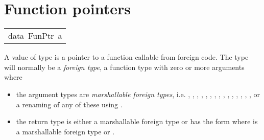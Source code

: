 \section{Function pointers
}
\begin{haddockdesc}
\item[\begin{tabular}{@{}l}
data\ FunPtr\ a
\end{tabular}]\haddockbegindoc
A value of type  is a pointer to a function callable
 from foreign code.  The type  will normally be a \emph{foreign type},
 a function type with zero or more arguments where
\par
\begin{itemize}
\item
 the argument types are \emph{marshallable foreign types},
   i.e. , , , ,
   , , , ,
   , , ,
   , , , ,
    or a renaming of any of these
   using .
\par

\item
 the return type is either a marshallable foreign type or has the form
    where  is a marshallable foreign type or \haddocktt{()}.
\par


\end{itemize}
\end{haddockdesc}
